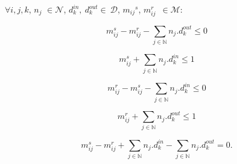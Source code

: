     	
    
    $\forall i, j, k$, ${n_{j}}$  $\in \mathcal{N}$, $d_k^{in},~d_k^{out}\in~\mathcal{D}$, ${m_{ij}}^{s}$, $m_{ij}^{r}$~$\in\mathcal{M} $:\newline

	\begin{equation}
		 {m_{ij}^{s}} - m_{ij}^{r} - \sum_{j \in \mathbb{N} } n_{j}.d_{k}^{out} \leq 0 
		\label{eqs3} 
	\end{equation}
	
	\begin{equation}%
		{m_{ij}^{s}}  + \sum_{j \in \mathbb{N} } n_{j}.d_{k}^{in} \leq 1 
		\label{eqs4}
	\end{equation}
	
	\begin{equation}%
		{m_{ij}^{r}} - m_{ij}^{s} - \sum_{j \in \mathbb{N} } n_{j}.d_{k}^{in} \leq 0
		\label{eqs5}
	\end{equation}

	\begin{equation}%
		{m_{ij}^{r}}  + \sum_{j \in \mathbb{N} } n_{j}.d_{k}^{out} \leq 1 
		\label{eqs6}
	\end{equation}
	

	\begin{equation}%
		{m_{ij}^{s}} - m_{ij}^{r} + \sum_{j \in \mathbb{N} } n_{j}.d_{k}^{in} - \sum_{j \in \mathbb{N} } n_{j}.d_{k}^{out} = 0.
		\label{eqs7}
	\end{equation}
	



	
